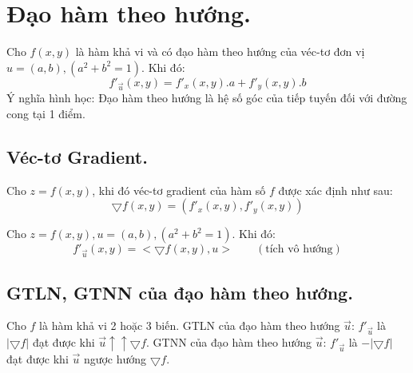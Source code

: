 \documentclass[12pt, a4paper]{report}
\begin{document}
\section{Đạo hàm theo hướng.}
Cho $f(x,y)$ là hàm khả vi và có đạo hàm theo hướng của véc-tơ đơn vị $u=(a,b), (a^2 + b ^2 = 1)$. Khi đó:
\[
    f'_{\Vec{u}} (x,y) = f'_x (x,y).a + f'_y (x,y).b    
\] 
Ý nghĩa hình học: Đạo hàm theo hướng là hệ số góc của tiếp tuyến đối với đường cong tại 1 điểm.
\subsection{Véc-tơ Gradient.}
Cho $z=f(x,y)$, khi đó véc-tơ gradient của hàm số $f$ được xác định như sau:
\[
    \bigtriangledown f(x,y) = (f'_x (x,y),f'_y (x,y))
\]

Cho $z=f(x,y),u=(a,b), (a^2 + b ^2 = 1)$. Khi đó:
\[
    f'_{\Vec{u}} (x,y) = < \bigtriangledown f(x,y),u > \qquad (\text{tích vô hướng})
\]
\subsection{GTLN, GTNN của đạo hàm theo hướng.}
Cho $f$ là hàm khả vi 2 hoặc 3 biến. GTLN của đạo hàm theo hướng $\Vec{u}$: $f'_{\Vec{u}}$ là $|\bigtriangledown f|$ đạt được khi $\Vec{u} \uparrow \uparrow \bigtriangledown f$. GTNN của đạo hàm theo hướng $\Vec{u}$: $f'_{\Vec{u}}$ là $-|\bigtriangledown f|$ đạt được khi $\Vec{u}$ ngược hướng $\bigtriangledown f$.
\end{document}
